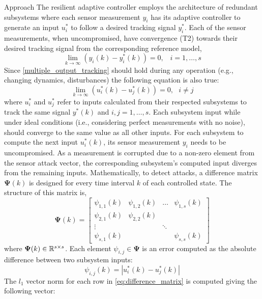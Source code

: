 \begin{section}{Approach}
The resilient adaptive controller employs the architecture of redundant subsystems where each sensor measurement $y_i$ has its adaptive controller to generate an input $u^*_i$ to follow a desired tracking signal $y^*_i$. Each of the sensor measurements, when uncompromised, have convergence (T2) towards their desired tracking signal from the corresponding reference model,
    \begin{equation}
    \label{multiple_output_tracking}
    \lim_{k\to\infty}(y_i(k)-y^*_i(k))=0, \;\;\; i=1,\dots,s
    \end{equation}
Since \eqref{multiple_output_tracking} should hold during any operation (e.g., changing dynamics, disturbances) the following equation is also true:
\begin{equation}
    \label{eq:u_to_0}
    \lim_{k\to\infty}(u^*_i(k)-u^*_j(k))=0, \text{ }i\neq j
\end{equation}
where $u^*_i$ and $u^*_j$ refer to inputs calculated from their respected subsystems to track the same signal $y^*(k)$ and $i,j = 1,\dots,s$. Each subsystem input while under ideal conditions (i.e., considering perfect measurements with no noise), should converge to the same value as all other inputs. For each subsystem to compute the next input $u^*_i(k)$, its sensor measurement $y_i$ needs to be uncompromised. As a measurement is corrupted due to a non-zero element from the sensor attack vector, the corresponding subsystem's computed input diverges from the remaining inputs. Mathematically, to detect attacks, a difference matrix $\bm{\Psi}(k)$ is designed for every time interval $k$ of each controlled state. The structure of this matrix is,
    \begin{equation}
    \label{eq:difference_matrix}
	\bm{\Psi}(k)=\begin{bmatrix} \psi_{1,1}(k) & \psi_{1,2}(k) & \dots & \psi_{1,s}(k) \\ \psi_{2,1}(k) & \psi_{2,2}(k) &  &  \\ \vdots &  & \ddots &  \\ \psi_{s,1}(k) &  &  & \psi_{s,s}(k) \end{bmatrix}
	\end{equation}
where $\bm{\Psi}(k) \in \mathbb{R}^{s\times s}$. Each element $\psi_{i,j}\in\bm{\Psi}$ is an error computed as the absolute difference between two subsystem inputs:
    \begin{equation}
        \label{eq:input_diff}
        \psi_{i,j}(k)=|u^*_i(k)-u^*_j(k)|
    \end{equation}
The $l_1$ vector norm for each row in \eqref{eq:difference_matrix} is computed giving the following vector:

\end{section}
